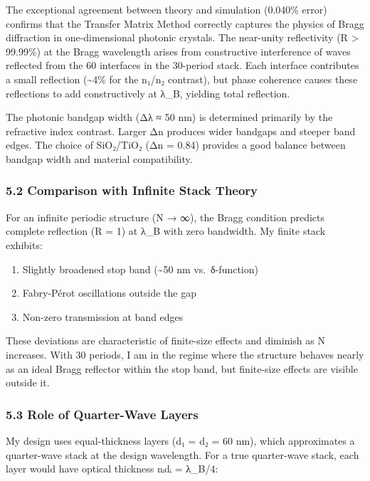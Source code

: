 \documentclass[
]{article}
\providecommand{\tightlist}{%
  \setlength{\itemsep}{0pt}\setlength{\parskip}{0pt}}
\begin{document}
The exceptional agreement between theory and simulation (0.040\% error)
confirms that the Transfer Matrix Method correctly captures the physics
of Bragg diffraction in one-dimensional photonic crystals. The
near-unity reflectivity (R \textgreater{} 99.99\%) at the Bragg
wavelength arises from constructive interference of waves reflected from
the 60 interfaces in the 30-period stack. Each interface contributes a
small reflection (\textasciitilde4\% for the n₁/n₂ contrast), but phase
coherence causes these reflections to add constructively at λ\_B,
yielding total reflection.

The photonic bandgap width (Δλ ≈ 50 nm) is determined primarily by the
refractive index contrast. Larger Δn produces wider bandgaps and steeper
band edges. The choice of SiO₂/TiO₂ (Δn = 0.84) provides a good balance
between bandgap width and material compatibility.

\subsubsection{5.2 Comparison with Infinite Stack
Theory}\label{comparison-with-infinite-stack-theory}

For an infinite periodic structure (N → ∞), the Bragg condition predicts
complete reflection (R = 1) at λ\_B with zero bandwidth. My finite stack
exhibits:

\begin{enumerate}
\def\labelenumi{\arabic{enumi}.}
\tightlist
\item
  Slightly broadened stop band (\textasciitilde50 nm vs.~δ-function)
\item
  Fabry-Pérot oscillations outside the gap
\item
  Non-zero transmission at band edges
\end{enumerate}

These deviations are characteristic of finite-size effects and diminish
as N increases. With 30 periods, I am in the regime where the structure
behaves nearly as an ideal Bragg reflector within the stop band, but
finite-size effects are visible outside it.

\subsubsection{5.3 Role of Quarter-Wave
Layers}\label{role-of-quarter-wave-layers}

My design uses equal-thickness layers (d₁ = d₂ = 60 nm), which
approximates a quarter-wave stack at the design wavelength. For a true
quarter-wave stack, each layer would have optical thickness nᵢdᵢ =
λ\_B/4:
\end{document}
